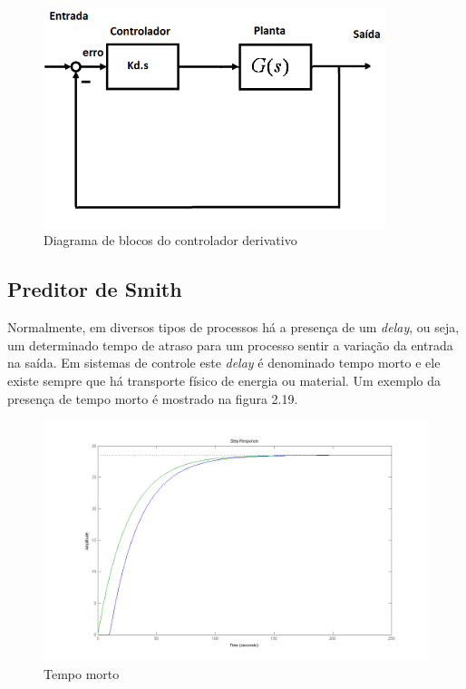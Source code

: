 \begin{figure}[!htb]

\center

\includegraphics[width=10cm]{imagens/planta_derivativo.png}

\label{Diagrama de blocos do controlador derivativo}

\caption{Diagrama de blocos do controlador derivativo}

\end{figure}

\subsection{Preditor de Smith}

Normalmente, em diversos tipos de processos há a presença de um \textit{delay}, ou seja, um determinado tempo de atraso para um processo sentir a variação da entrada na saída. Em sistemas de controle este \textit{delay} é denominado tempo morto e ele existe sempre que há transporte físico de energia ou material. Um exemplo da presença de tempo morto é mostrado na figura 2.19.

\begin{figure}[H]

\center

\includegraphics[width=12cm]{imagens/tempo_morto.png}

\label{Tempo morto}

\caption{Tempo morto}

\end{figure}

